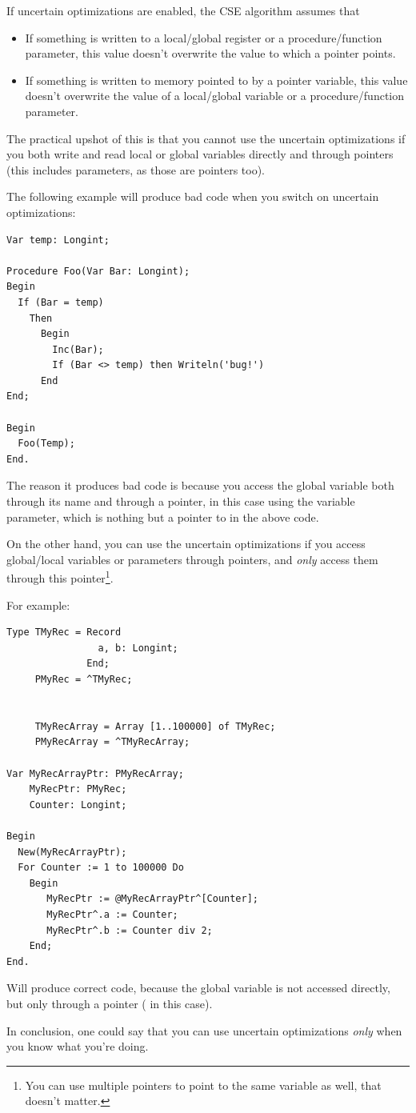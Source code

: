 \begin{enumerate}
\begin{remark}If uncertain optimizations are enabled, the CSE algorithm assumes
that
\begin{itemize}
\item If something is written to a local/global register or a
procedure/function parameter, this value doesn't overwrite the value to
which a pointer points.
\item If something is written to memory pointed to by a pointer variable,
this value doesn't overwrite the value of a local/global variable or a
procedure/function parameter.
\end{itemize}
\end{remark}
The practical upshot of this is that you cannot use the uncertain
optimizations if you both write and read local or global variables directly and
through pointers (this includes  parameters, as those are pointers too).

The following example will produce bad code when you switch on
uncertain optimizations:
\begin{verbatim}
Var temp: Longint;

Procedure Foo(Var Bar: Longint);
Begin
  If (Bar = temp)
    Then
      Begin
        Inc(Bar);
        If (Bar <> temp) then Writeln('bug!')
      End
End;

Begin
  Foo(Temp);
End.
\end{verbatim}
The reason it produces bad code is because you access the global variable
 both through its name  and through a pointer, in this
case using the  variable parameter, which is nothing but a pointer
to  in the above code.

On the other hand, you can use the uncertain optimizations if
you access global/local variables or parameters through pointers,
and {\em only} access them through this pointer\footnote{
You can use multiple pointers to point to the same variable as well, that
doesn't matter.}.

For example:
\begin{verbatim}
Type TMyRec = Record
                a, b: Longint;
              End;
     PMyRec = ^TMyRec;


     TMyRecArray = Array [1..100000] of TMyRec;
     PMyRecArray = ^TMyRecArray;

Var MyRecArrayPtr: PMyRecArray;
    MyRecPtr: PMyRec;
    Counter: Longint;

Begin
  New(MyRecArrayPtr);
  For Counter := 1 to 100000 Do
    Begin
       MyRecPtr := @MyRecArrayPtr^[Counter];
       MyRecPtr^.a := Counter;
       MyRecPtr^.b := Counter div 2;
    End;
End.
\end{verbatim}
Will produce correct code, because the global variable 
is not accessed directly, but only through a pointer ( in this
case).

In conclusion, one could say that you can use uncertain optimizations {\em
only} when you know what you're doing.
\end{enumerate}

